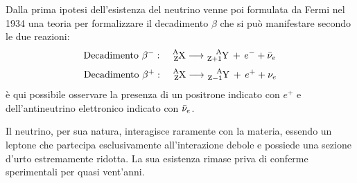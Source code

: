 Dalla prima ipotesi dell'esistenza del neutrino venne poi formulata da Fermi nel 1934 \cite{Fermi:1934hr} una teoria per formalizzare il decadimento $\beta$ che si può manifestare secondo le due reazioni:
\begin{equation}
    \text{Decadimento } \beta^-: \quad \ce{^A_ZX}\longrightarrow \ce{^A_{Z+1}Y}\,+\,e^-+\Bar{\nu}_e
    \label{eq:decadimento beta -}
\end{equation}
\begin{equation}
    \text{Decadimento } \beta^+: \quad \ce{^A_ZX}\longrightarrow \ce{^A_{Z-1}Y}\,+\,e^++\nu_e
\end{equation}
è qui possibile osservare la presenza di un positrone indicato con $e^+$ e dell'antineutrino elettronico indicato con $\Bar{\nu}_e$. 

Il neutrino, per sua natura, interagisce raramente con la materia, essendo un leptone che partecipa esclusivamente all’interazione debole e possiede una sezione d'urto estremamente ridotta. La sua esistenza rimase priva di conferme sperimentali per quasi vent’anni.
